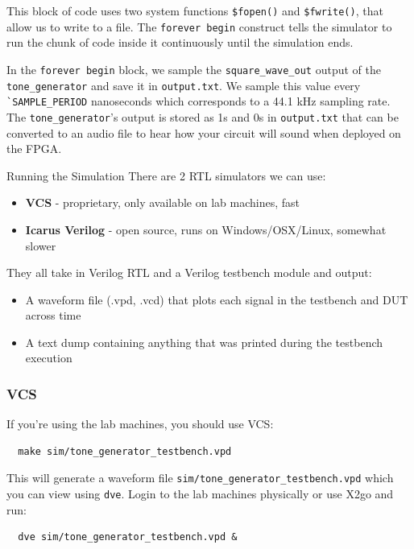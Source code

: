 \documentclass[11pt]{article}
\makeatletter
\renewcommand{\subsection}
{\@startsection {subsection}{1}{0pt}
 {-1ex}
 {0.5ex}
 {\bfseries\normalsize}}
\makeatother
\begin{document}
This block of code uses two system functions \verb|$fopen()| and \verb|$fwrite()|, that allow us to write to a file.
The \verb|forever begin| construct tells the simulator to run the chunk of code inside it continuously until the simulation ends.

In the \verb|forever begin| block, we sample the \verb|square_wave_out| output of the \verb|tone_generator| and save it in \verb|output.txt|.
We sample this value every \verb|`SAMPLE_PERIOD| nanoseconds which corresponds to a 44.1 kHz sampling rate.
The \verb|tone_generator|'s output is stored as 1s and 0s in \verb|output.txt| that can be converted to an audio file to hear how your circuit will sound when deployed on the FPGA.

\subsection{Running the Simulation}
There are 2 RTL simulators we can use:
\begin{itemize}
  \item \textbf{VCS} - proprietary, only available on lab machines, fast
  \item \textbf{Icarus Verilog} - open source, runs on Windows/OSX/Linux, somewhat slower
\end{itemize}
They all take in Verilog RTL and a Verilog testbench module and output:
\begin{itemize}
  \item A waveform file (.vpd, .vcd) that plots each signal in the testbench and DUT across time
  \item A text dump containing anything that was printed during the testbench execution
\end{itemize}

\subsubsection{VCS}
If you're using the lab machines, you should use VCS:
\begin{verbatim}
  make sim/tone_generator_testbench.vpd
\end{verbatim}
This will generate a waveform file \verb|sim/tone_generator_testbench.vpd| which you can view using \verb|dve|.
Login to the lab machines physically or use X2go and run:
\begin{verbatim}
  dve sim/tone_generator_testbench.vpd &
\end{verbatim}
\end{document}
